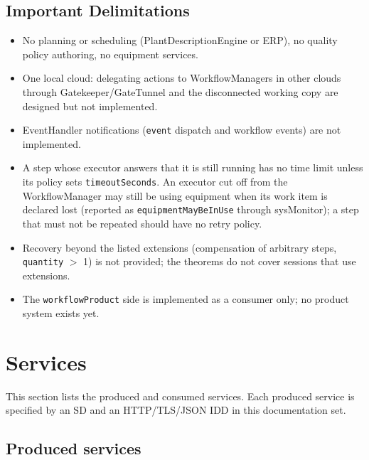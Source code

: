 \documentclass[a4paper]{arrowhead}
\begin{document}
\subsection{Important Delimitations}
\label{sec:delimitations}
\begin{itemize}
\item No planning or scheduling (PlantDescriptionEngine or ERP), no quality policy authoring, no equipment services.
\item One local cloud: delegating actions to WorkflowManagers in other clouds through Gatekeeper/GateTunnel and the
disconnected working copy are designed but not implemented.
\item EventHandler notifications (\texttt{event} dispatch and workflow events) are not implemented.
\item A step whose executor answers that it is still running has no time limit unless its policy sets
\texttt{timeout\allowbreak{}Seconds}. An executor cut off from the WorkflowManager may still be using equipment when its work item is
declared lost (reported as \texttt{equipment\allowbreak{}May\allowbreak{}Be\allowbreak{}In\allowbreak{}Use} through sysMonitor); a step that must not be repeated should have
no retry policy.
\item Recovery beyond the listed extensions (compensation of arbitrary steps, \texttt{quantity} $>$ 1) is not provided;
the theorems do not cover sessions that use extensions.
\item The \texttt{workflow\allowbreak{}Product} side is implemented as a consumer only; no product system exists yet.
\end{itemize}

\newpage
\section{Services}
\label{sec:services}
This section lists the produced and consumed services. Each produced service is specified by an SD and an HTTP/TLS/JSON
IDD in this documentation set.

\subsection{Produced services}
\end{document}
